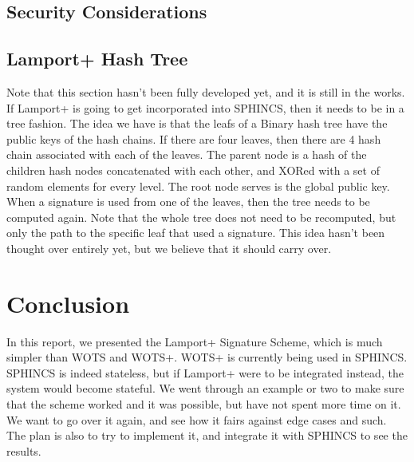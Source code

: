 \documentclass[]{scrartcl}
\begin{document}

\subsection*{Security Considerations}


\subsection*{Lamport+ Hash Tree}
Note that this section hasn't been fully developed yet, and it is still in the works. If Lamport+ is going to get incorporated into SPHINCS, then it needs to be in a tree fashion. The idea we have is that the leafs of a Binary hash tree have the public keys of the hash chains. If there are four leaves, then there are 4 hash chain associated with each of the leaves. The parent node is a hash of the children hash nodes concatenated with each other, and XORed with a set of random elements for every level. The root node serves is the global public key.\\
When a signature is used from one of the leaves, then the tree needs to be computed again. Note that the whole tree does not need to be recomputed, but only the path to the specific leaf that used a signature. This idea hasn't been thought over entirely yet, but we believe that it should carry over.

\section*{Conclusion}
In this report, we presented the Lamport+ Signature Scheme, which is much simpler than WOTS and WOTS+. WOTS+ is currently being used in SPHINCS. SPHINCS is indeed stateless, but if Lamport+ were to be integrated instead, the system would become stateful. We went through an example or two to make sure that the scheme worked and it was possible, but have not spent more time on it. We want to go over it again, and see how it fairs against edge cases and such. The plan is also to try to implement it, and integrate it with SPHINCS to see the results.
\end{document}
